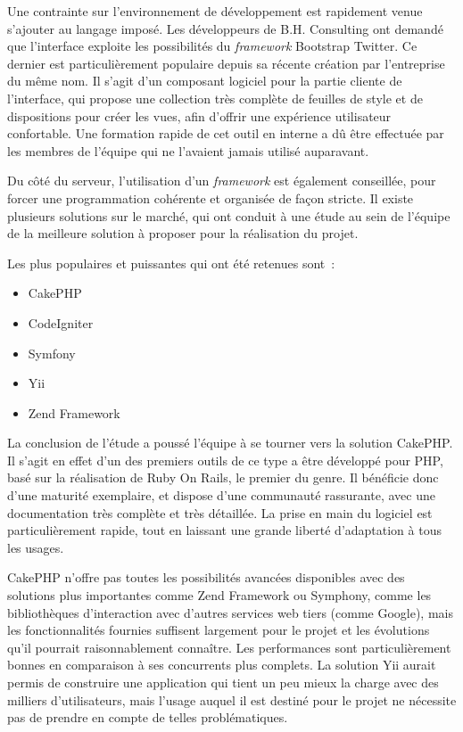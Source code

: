 Une contrainte sur l'environnement de développement est rapidement venue s'ajouter au langage imposé. Les développeurs de B.H. Consulting ont demandé que l'interface exploite les possibilités du \textit{framework} Bootstrap Twitter. Ce dernier est particulièrement populaire depuis sa récente création par l'entreprise du même nom. Il s'agit d'un composant logiciel pour la partie cliente de l'interface, qui propose une collection très complète de feuilles de style et de dispositions pour créer les vues, afin d'offrir une expérience utilisateur confortable. Une formation rapide de cet outil en interne a dû être effectuée par les membres de l'équipe qui ne l'avaient jamais utilisé auparavant.

Du côté du serveur, l'utilisation d'un \textit{framework} est également conseillée, pour forcer une programmation cohérente et organisée de façon stricte. Il existe plusieurs solutions sur le marché, qui ont conduit à une étude au sein de l'équipe de la meilleure solution à proposer pour la réalisation du projet.

Les plus populaires et puissantes qui ont été retenues sont~:

\begin{itemize}
\item CakePHP
\item CodeIgniter
\item Symfony
\item Yii
\item Zend Framework
\end{itemize}

La conclusion de l'étude a poussé l'équipe à se tourner vers la solution CakePHP. Il s'agit en effet d'un des premiers outils de ce type a être développé pour PHP, basé sur la réalisation de Ruby On Rails, le premier du genre. Il bénéficie donc d'une maturité exemplaire, et dispose d'une communauté rassurante, avec une documentation très complète et très détaillée. La prise en main du logiciel est particulièrement rapide, tout en laissant une grande liberté d'adaptation à tous les usages.

CakePHP n'offre pas toutes les possibilités avancées disponibles avec des solutions plus importantes comme Zend Framework ou Symphony, comme les bibliothèques d'interaction avec d'autres services web tiers (comme Google), mais les fonctionnalités fournies suffisent largement pour le projet et les évolutions qu'il pourrait raisonnablement connaître. Les performances sont particulièrement bonnes en comparaison à ses concurrents plus complets. La solution Yii aurait permis de construire une application qui tient un peu mieux la charge avec des milliers d'utilisateurs, mais l'usage auquel il est destiné pour le projet ne nécessite pas de prendre en compte de telles problématiques.

